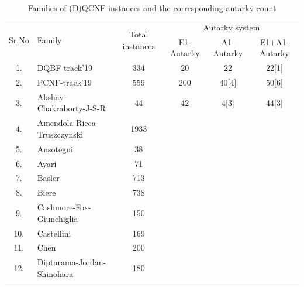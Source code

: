 \documentclass[runningheads]{llncs}
\begin{document}
\begin{table}
\caption{Families of (D)QCNF instances and the corresponding autarky count}\label{tab:aut-count}
\begin{tabular}{c|l|c|c|c|c}

\hline
   \multirow{2}{1cm}{Sr.No} &  \multirow{2}{3cm}{Family} &  \multirow{2}{2cm}{Total instances} & \multicolumn{3}{c}{Autarky system} \\
    \cline{4-6}
  & & & E1-Autarky & A1-Autarky & E1+A1-Autarky \\

\hline

1. & DQBF-track'19 &  334 & 20 & 22 & 22[1] \\ \hline
2. & PCNF-track'19 &  559 & 200 & 40[4] & 50[6] \\ \hline
3. & Akshay-Chakraborty-J-S-R &  44 & 42 & 4[3] & 44[3] \\ \hline
4. & Amendola-Ricca-Truszczynski & 1933 & &  &  \\ \hline

5. & Ansotegui &  38 & &  &  \\ \hline

6. & Ayari &  71 &  &  &  \\ \hline

7. & Basler &  713 & & &  \\ \hline

8. & Biere &  738 & &  &  \\ \hline

9. & Cashmore-Fox-Giunchiglia &  150 &  &  &  \\ \hline

10. & Castellini &  169 & &  &  \\ \hline

11. & Chen &  200 &  &  &  \\ \hline

12. & Diptarama-Jordan-Shinohara &  180 &  &  &  \\ \hline


\end{tabular}
\end{table}
\end{document}
